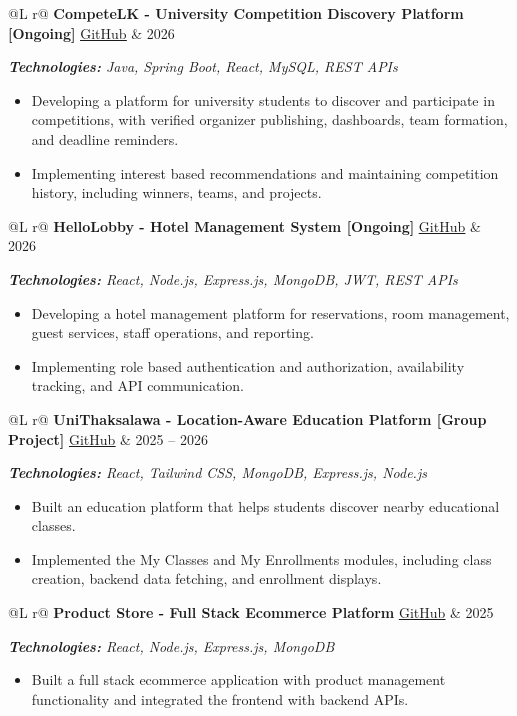 \documentclass[10pt,a4paper]{article}
\makeatletter
\newcommand{\repolink}[1]{%
    \href{#1}{\underline{GitHub}}
}
\newenvironment{cvproject}[4]{%
    \par\noindent
    \begin{tabularx}{\linewidth}{@{}L r@{}}
        \textbf{#1}\quad #2 & #4 \\
    \end{tabularx}\par

    \textit{\textbf{Technologies:} #3}\par
    \nopagebreak

    \begin{itemize}[
        leftmargin=13pt,
        itemsep=0.4pt,
        topsep=0.5pt,
        parsep=0pt,
        partopsep=0pt
    ]
}{%
    \end{itemize}
    \par\vspace{5pt}
}
\makeatother
\begin{document}
\begin{cvproject}
    {CompeteLK - University Competition Discovery Platform [Ongoing]}
    {\repolink{https://github.com/savandikodithuwakku/competelk-backend}}
    {Java, Spring Boot, React, MySQL, REST APIs}
    {2026}

    \item Developing a platform for university students to discover and
    participate in competitions, with verified organizer publishing,
    dashboards, team formation, and deadline reminders.

    \item Implementing interest based recommendations and maintaining
    competition history, including winners, teams, and projects.

\end{cvproject}

\begin{cvproject}
    {HelloLobby - Hotel Management System [Ongoing]}
    {\repolink{https://github.com/savandikodithuwakku/Hello-Lobby-Hotel-Management-System-Frontend}}
    {React, Node.js, Express.js, MongoDB, JWT, REST APIs}
    {2026}

    \item Developing a hotel management platform for reservations,
    room management, guest services, staff operations, and reporting.

    \item Implementing role based authentication and authorization,
    availability tracking, and API communication.

\end{cvproject}

\begin{cvproject}
    {UniThaksalawa - Location-Aware Education Platform [Group Project]}
    {\repolink{https://github.com/Lumos-Solution/uni-thaksalawa-frontend}}
    {React, Tailwind CSS, MongoDB, Express.js, Node.js}
    {2025 -- 2026}

    \item Built an education platform that helps students discover nearby
    educational classes.

    \item Implemented the My Classes and My Enrollments modules, including
    class creation, backend data fetching, and enrollment displays.

\end{cvproject}

\begin{cvproject}
    {Product Store - Full Stack Ecommerce Platform}
    {\repolink{https://github.com/savandikodithuwakku/Product-Store-Frontend}}
    {React, Node.js, Express.js, MongoDB}
    {2025}

    \item Built a full stack ecommerce application with product management
    functionality and integrated the frontend with backend APIs.

\end{cvproject}
\end{document}
